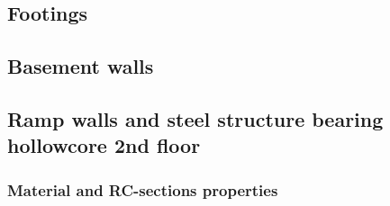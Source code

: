
\subsection{Footings}

\subsection{Basement walls}

%
\subsection{Ramp walls and steel structure bearing hollowcore 2nd floor}

\subsubsection{Material and RC-sections properties}

